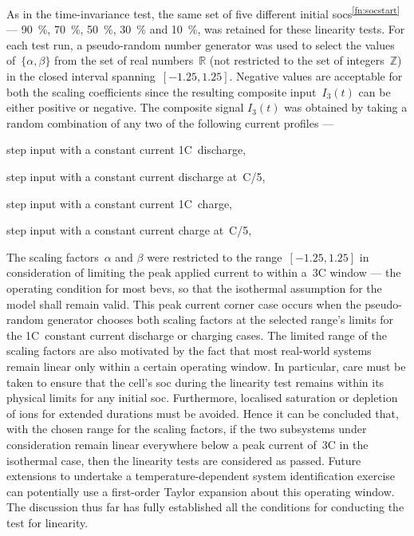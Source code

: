 As   in   the  time-invariance   test,   the   same   set  of   five   different
initial  \glspl{soc}\textsuperscript{\ref{fn:socstart}}  ---  \SI{90}{\percent},
\SI{70}{\percent},  \SI{50}{\percent}, \SI{30}{\percent}  and \SI{10}{\percent},
was  retained for  these linearity  tests. For  each test  run, a  pseudo-random
number generator  was used to select  the values of~$\{\alpha,\beta\}$  from the
set  of  real numbers~$\mathbb{R}$  (not  restricted  to  the set  of  integers~$\mathbb{Z}$) in  the closed  interval spanning~$[-1.25,1.25]$.  Negative values
are acceptable for  both the scaling coefficients since  the resulting composite
input~$I_3(t)$ can be either positive or negative. The composite signal $I_3(t)$
was obtained by taking a random combination  of any two of the following current
profiles ---
\begin{enumerate*}[label=\emph{\alph*})]
    \item step input with a constant current 1C~discharge,
    \item step input with a constant current discharge at~C/5,
    \item step input with a constant current 1C~charge,
    \item step input with a constant current charge at~C/5,
\end{enumerate*}

The   scaling   factors~$\alpha$   and    $\beta$   were   restricted   to   the
range~$[-1.25,1.25]$ in  consideration of limiting  the peak applied  current to
within a~\pm 3C window --- the operating condition for most \glspl{bev}, so that
the isothermal  assumption for the model  shall remain valid. This  peak current
corner case occurs when the pseudo-random generator chooses both scaling factors
at the selected range's limits for the 1C~constant current discharge or charging
cases. The limited range  of the scaling factors are also  motivated by the fact
that  most real-world  systems remain  linear  only within  a certain  operating
window. In  particular, care must be  taken to ensure that  the cell's \gls{soc}
during the  linearity test remains  within its  physical limits for  any initial
\gls{soc}. Furthermore, localised  saturation or depletion of  ions for extended
durations must be avoided. Hence it can be concluded that, with the chosen range
for the scaling factors, if the two subsystems under consideration remain linear
everywhere  below a  peak current  of~\pm 3C  in the  isothermal case,  then the
linearity  tests are  considered as  passed.  Future extensions  to undertake  a
temperature-dependent  system  identification  exercise can  potentially  use  a
first-order Taylor  expansion about this  operating window. The  discussion thus
far  has fully  established  all  the conditions  for  conducting  the test  for
linearity.

